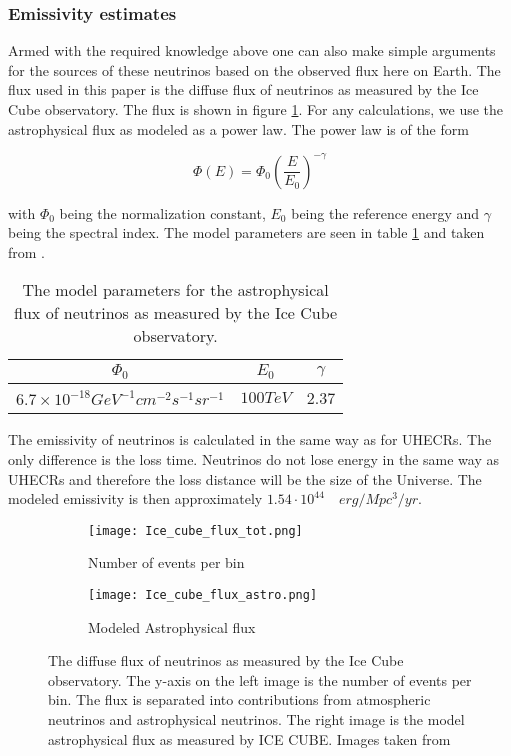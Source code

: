 \subsubsection{Emissivity estimates}
\label{sec:emmisivity_neutrinos}

Armed with the required knowledge above one can also make simple arguments for the sources of these neutrinos based on the observed 
flux here on Earth. The flux used in this paper is the diffuse flux of neutrinos as measured by the Ice Cube observatory. The flux is shown in figure \ref{fig:flux_neutrinos}. 
For any calculations, we use the astrophysical flux as modeled as a power law. The power law is of the form 

\begin{equation}
    \Phi(E) = \Phi_0 \left(\frac{E}{E_0}\right)^{-\gamma}
\end{equation}

with $\Phi_0$ being the normalization constant, $E_0$ being the reference energy and $\gamma$ being the spectral index. The model parameters are seen in table \ref{tab:neutrino_flux} and taken from \cite{Abbasi_2022}.

\begin{table}
    \centering
    \begin{tabular}{|c|c|c|}
        \hline
        $\Phi_0$ & $E_0$ & $\gamma$ \\
        \hline
        $6.7\times 10^{-18} GeV^{-1} cm^{-2} s^{-1} sr^{-1}$ & $100 TeV$ & 2.37 \\
        \hline
    \end{tabular}
    \caption{The model parameters for the astrophysical flux of neutrinos as measured by the Ice Cube observatory.}
    \label{tab:neutrino_flux}
\end{table}

The emissivity of neutrinos is calculated in the same way as for UHECRs. The only difference is the loss time. Neutrinos do not lose energy in the same way as UHECRs and therefore the loss distance will be the size of the Universe. 
The modeled emissivity is then approximately $1.54 \cdot 10^{44} \quad erg/Mpc^3/yr$. 

\begin{figure}
    \centering
    \begin{subfigure}[b]{0.35\textwidth}
        \centering
        \texttt{[image: Ice\_cube\_flux\_tot.png]}
        \caption{Number of events per bin}
    \end{subfigure}%
    \begin{subfigure}[b]{0.5\textwidth}
        \centering
        \texttt{[image: Ice\_cube\_flux\_astro.png]}
        \caption{Modeled Astrophysical flux}
    \end{subfigure}
    \caption{The diffuse flux of neutrinos as measured by the Ice Cube observatory. The y-axis on the left image is the number of events per bin.  The flux is separated into contributions from atmospheric neutrinos and astrophysical neutrinos. The right image is the model astrophysical flux as measured by ICE CUBE. Images taken from \cite{Abbasi_2022} }
    \label{fig:flux_neutrinos}
\end{figure}


